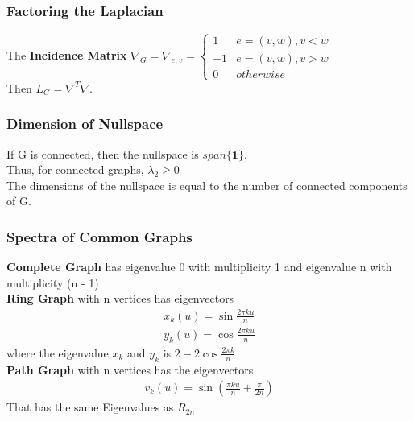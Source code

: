 \documentclass[12pt, letterpaper]{report}
\begin{document}
    \subsubsection{Factoring the Laplacian}
    The \textbf{Incidence Matrix} $\nabla_G = \nabla_{e, v} = \begin{cases}
        1 & e = (v, w), v < w\\
        -1 & e=(v,w), v>w\\
        0 & otherwise
    \end{cases}$\\
    Then $L_G = \nabla^T \nabla$.
    \subsubsection{Dimension of Nullspace}
    If G is connected, then the nullspace is $span\{\mathbf{1}\}$.\\
    \indent Thus, for connected graphs, $\lambda_2 \geq 0$\\
    \indent The dimensions of the nullspace is equal to the number of connected components of G.\\
    \subsubsection{Spectra of Common Graphs}
    \textbf{Complete Graph} has eigenvalue 0 with multiplicity 1 and eigenvalue n with multiplicity (n - 1)\\
    \textbf{Ring Graph} with n vertices has eigenvectors
    \begin{gather*}
        x_k (u) = \sin{\frac{2 \pi k u}{n}}\\
        y_k (u) = \cos{\frac{2 \pi k u}{n}}
    \end{gather*}
    where the eigenvalue $x_k$ and $y_k$ is $2-2\cos{\frac{2 \pi k}{n}}$\\
    \textbf{Path Graph} with n vertices has the eigenvectors \begin{gather*}
        v_k (u) = \sin (\frac{\pi k u}{n} + \frac{\pi}{2n})
    \end{gather*}
    That has the same Eigenvalues as $R_{2n}$
\end{document}
